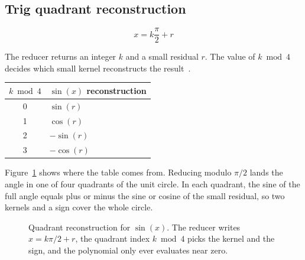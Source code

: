 \documentclass[manuscript, nonacm]{acmart}
\begin{document}
    \subsection{Trig quadrant reconstruction}

    \[ x = k\frac{\pi}{2} + r \]

    The reducer returns an integer $k$ and a small residual $r$. The value of
    $k \bmod 4$ decides which small kernel reconstructs the result~\cite{muller}.

    \begin{table}[tbp]
        \centering
        \begin{tabular}{cl}
            \toprule
            $k \bmod 4$ & $\sin(x)$ reconstruction \\
            \midrule
            0           & $\sin(r)$                \\
            1           & $\cos(r)$                \\
            2           & $-\sin(r)$               \\
            3           & $-\cos(r)$               \\
            \bottomrule
        \end{tabular}
    \end{table}

    Figure~\ref{fig:quadrants} shows where the table comes from. Reducing
    modulo $\pi/2$ lands the angle in one of four quadrants of the unit
    circle. In each quadrant, the sine of the full angle equals plus or
    minus the sine or cosine of the small residual, so two kernels and a sign
    cover the whole circle.

    \begin{figure}[tbp]
        \centering
        \caption{Quadrant reconstruction for $\sin(x)$. The reducer writes
            $x = k\pi/2 + r$, the quadrant index $k \bmod 4$ picks the kernel and
            the sign, and the polynomial only ever evaluates near zero.}
        \label{fig:quadrants}
    \end{figure}
\end{document}
